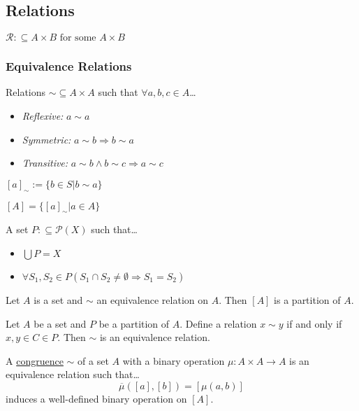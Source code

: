 \subsection{Relations}\label{relation}
$\mathcal{R} :\subseteq A \times B \textrm{ for some } A \times B$

\subsubsection{Equivalence Relations}\label{equivalencerelation}
Relations $\sim \subseteq A \times A$ such that $\forall a,b,c \in A$\dots
\begin{itemize}
  \item \emph{Reflexive:} $a \sim a$
  \item \emph{Symmetric:} $a \sim b \Rightarrow b \sim a$
  \item \emph{Transitive:} $a \sim b \land b \sim c \Rightarrow a \sim c$
\end{itemize}

$[a]_{\sim} := \{ b \in S | b \sim a \}$

$[A] = \{[a]_{\sim} | a \in A \}$

A set $P :\subseteq \mathcal{P}(X)$ such that\dots
\begin{itemize}
  \item $\bigcup P = X$
  \item $\forall S_1, S_2 \in P (S_1 \cap S_2 \neq \emptyset \Rightarrow S_1 = S_2)$
\end{itemize}

\begin{proposition}
Let $A$ is a set and $\sim$ an equivalence relation on $A$. Then $[A]$ is a partition of $A$.
\end{proposition}

\begin{proposition}
Let $A$ be a set and $P$ be a partition of $A$. Define a relation $x \sim y$ if and only if $x,y \in C \in P$. Then $\sim$ is an equivalence relation.
\end{proposition}

\label{congruencerelation}
A \hyperref[congruence]{congruence} $\sim$ of a set $A$ with a binary operation $\mu : A \times A \rightarrow A$ is an equivalence relation such that\dots
$$\overline{\mu}([a],[b]) = [\mu (a,b)]$$
induces a well-defined binary operation on $[A]$.


